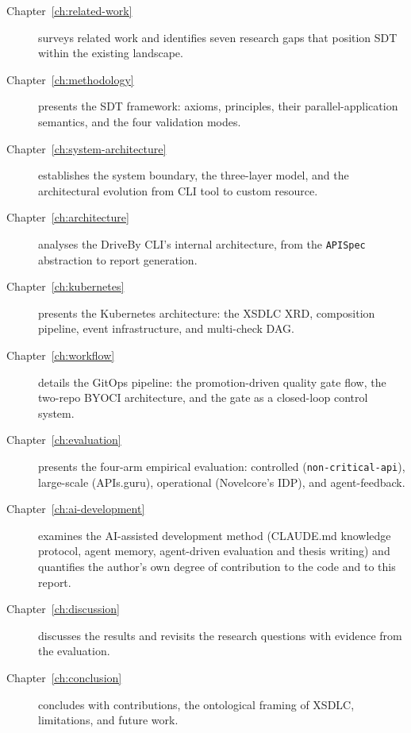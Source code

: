 \begin{description}
  \item[Chapter~\ref{ch:related-work}] surveys related work and identifies seven research gaps that position SDT within the existing landscape.

  \item[Chapter~\ref{ch:methodology}] presents the SDT framework: axioms, principles, their parallel-application semantics, and the four validation modes.

  \item[Chapter~\ref{ch:system-architecture}] establishes the system boundary, the three-layer model, and the architectural evolution from CLI tool to custom resource.

  \item[Chapter~\ref{ch:architecture}] analyses the DriveBy CLI's internal architecture, from the \texttt{APISpec} abstraction to report generation.

  \item[Chapter~\ref{ch:kubernetes}] presents the Kubernetes architecture: the XSDLC XRD, composition pipeline, event infrastructure, and multi-check DAG.

  \item[Chapter~\ref{ch:workflow}] details the GitOps pipeline: the promotion-driven quality gate flow, the two-repo BYOCI architecture, and the gate as a closed-loop control system.

  \item[Chapter~\ref{ch:evaluation}] presents the four-arm empirical evaluation: controlled (\texttt{non-critical-api}), large-scale (APIs.guru), operational (Novelcore's IDP), and agent-feedback.

  \item[Chapter~\ref{ch:ai-development}] examines the AI-assisted development method (CLAUDE.md knowledge protocol, agent memory, agent-driven evaluation and thesis writing) and quantifies the author's own degree of contribution to the code and to this report.

  \item[Chapter~\ref{ch:discussion}] discusses the results and revisits the research questions with evidence from the evaluation.

  \item[Chapter~\ref{ch:conclusion}] concludes with contributions, the ontological framing of XSDLC, limitations, and future work.
\end{description}
